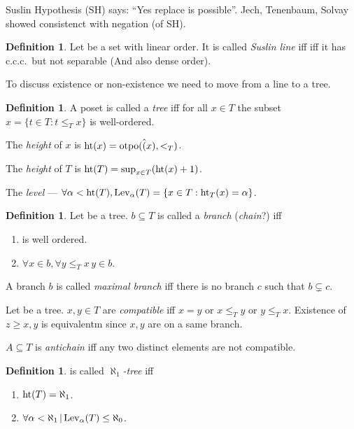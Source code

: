 \documentclass[11pt,pdftex,twoside,a4paper]{article}
\newcommand{\ccc}{c.c.c.}
\newcommand{\Lev}{\ensuremath{\mathop{\rm Lev}\nolimits}}
\newcommand{\otp}{\ensuremath{\mathop{\rm otpo}\nolimits}}
\newcommand{\tht}{\ensuremath{\mathop{\rm ht}\nolimits}}
\theoremstyle{definition}
\newtheorem{ldef}[thm]{Definition}
\begin{document}
{Suslin Hypothesis (SH) says: ``Yes replace is possible''.
Jech, Tenenbaum, Solvay showed consistenct with negation (of SH).

\begin{ldef}
  Let  be a set with linear order.
  It is called \emph{Suslin line} iff
  iff it has \ccc\ but not separable (And also dense order).
\end{ldef}

To discuss existence or non-existence we need to move from a line to a tree.
\begin{ldef}
  A poset  is called a \emph{tree} iff
  for all \(x\in T\) the subset
  \(\hat{x} = \{t\in T: t\leq_T x\}\) is well-ordered.
\end{ldef}

The \emph{height} of $x$ is \(\tht(x) = \otp(\hat(x),<_T)\).

The \emph{height} of $T$ is \(\tht(T) = \sup_{x\in T} (\tht(x) + 1)\).

The \emph{level} ---
 \(\forall \alpha<\tht(T), \Lev_\alpha(T) = \{x\in T: \tht_T(x)=\alpha\}\).

\begin{ldef}
Let  be a tree. \(b\subseteq T\) is called
a \emph{branch} (\emph{chain}?) iff 
\begin{enumerate}[label=(\alph*)]
\item {} is well ordered.
\item \(\forall x\in b, \forall y\leq_T x\, y\in b\).
\end{enumerate}
\end{ldef}

A branch $b$ is called \emph{maximal branch} iff there is no 
branch $c$ such that \(b\subsetneq c\).

Let  be a tree. \(x,y\in T\) 
are \emph{compatible} iff \(x=y\) or \(x\leq_T y\) or \(y\leq_Tx\).
Existence of \(z\geq x,y\) is equivalentm since \(x,y\) are on a same branch.

\(A\subseteq T\) is \emph{antichain} iff any two distinct elements 
are not compatible.

\begin{ldef}
 is called \(\aleph_1\)\emph{-tree} iff
\begin{enumerate}[label=(\alph*)]
\item \(\tht(T)=\aleph_1\).
\item \(\forall \alpha<\aleph_1\, |\Lev_\alpha(T)\leq\aleph_0\).
\end{enumerate}
\end{ldef}

}
\end{document}

